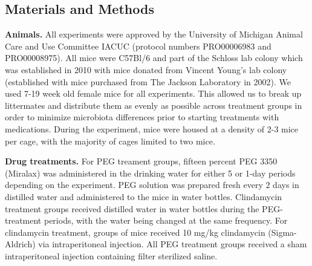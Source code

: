 \documentclass[
  11pt,
]{article}
\begin{document}
\hypertarget{materials-and-methods}{%
\subsection{Materials and Methods}\label{materials-and-methods}}

\textbf{Animals.} All experiments were approved by the University of
Michigan Animal Care and Use Committee IACUC (protocol numbers
PRO00006983 and PRO00008975). All mice were C57Bl/6 and part of the
Schloss lab colony which was established in 2010 with mice donated from
Vincent Young's lab colony (established with mice purchased from The
Jackson Laboratory in 2002). We used 7-19 week old female mice for all
experiments. This allowed us to break up littermates and distribute them
as evenly as possible across treatment groups in order to minimize
microbiota differences prior to starting treatments with medications.
During the experiment, mice were housed at a density of 2-3 mice per
cage, with the majority of cages limited to two mice.

\textbf{Drug treatments.} For PEG treament groups, fifteen percent PEG
3350 (Miralax) was administered in the drinking water for either 5 or
1-day periods depending on the experiment. PEG solution was prepared
fresh every 2 days in distilled water and administered to the mice in
water bottles. Clindamycin treatment groups received distilled water in
water bottles during the PEG-treatment periods, with the water being
changed at the same frequency. For clindamycin treatment, groups of mice
received 10 mg/kg clindamycin (Sigma-Aldrich) via intraperitoneal
injection. All PEG treatment groups received a sham intraperitoneal
injection containing filter sterilized saline.
\end{document}
